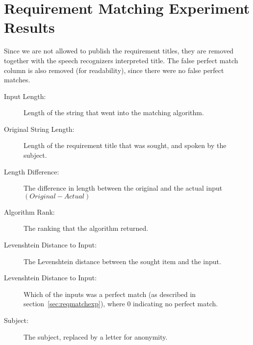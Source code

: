 \chapter{Requirement Matching Experiment Results}
\label{app:reqmatchexpres}
Since we are not allowed to publish the requirement titles, they are removed together with the speech recognizers interpreted title. The false perfect match column is also removed (for readability), since there were no false perfect matches.

\begin{description}
\item[Input Length:] Length of the string that went into the matching algorithm.
\item[Original String Length:] Length of the requirement title that was sought, and spoken by the subject.
\item[Length Difference:] The difference in length between the original and the actual input $ (Original - Actual) $
\item[Algorithm Rank:] The ranking that the algorithm returned.
\item[Levenshtein Distance to Input:] The Levenshtein distance between the sought item and the input.
\item[Levenshtein Distance to Input:] Which of the inputs was a perfect match (as described in section~\ref{sec:reqmatchexp}), where 0 indicating no perfect match.
\item[Subject:] The subject, replaced by a letter for anonymity.
\end{description}

\newpage


